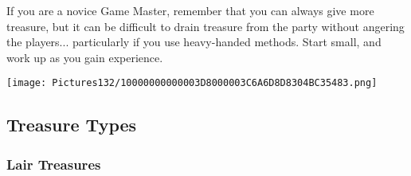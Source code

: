 \documentclass[a4paper,twoside,openany,10pt]{book}
\begin{document}
\begin{multicols}{2}
If you are a novice Game Master, remember that you can always give more treasure, but it can be difficult to drain treasure from the party without angering the players... particularly if you use heavy-handed methods. Start small, and work up as you gain experience. 

\begin{flushleft} \texttt{[image: Pictures132/10000000000003D8000003C6A6D8D8304BC35483.png]}  \end{flushleft}

\end{multicols}

\subsection{Treasure Types}\label{treasure-types}

\subsubsection{Lair Treasures}\label{lair-treasures}
\end{document}
